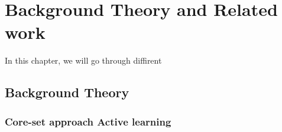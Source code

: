 \chapter{Background Theory and Related work}\label{T-B}
\label{cha:TheoryAndBackground}

In this chapter, we will go through diffirent 


\section{Background Theory}





\subsection{Core-set approach Active learning}
\label{sec:no1}





